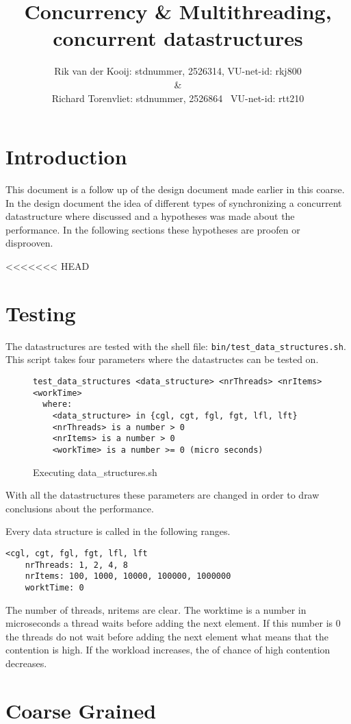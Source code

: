 \documentclass[10pt,a4paper]{article}
\author{Rik van der Kooij: stdnummer, 2526314, VU-net-id: rkj800\\ \&  \\ Richard Torenvliet: stdnummer, 2526864 \ VU-net-id: rtt210}
\title{Concurrency \& Multithreading, concurrent datastructures}
\begin{document}
\maketitle
\tableofcontents

\section{Introduction}
This document is a follow up of the design document made earlier in this coarse. In the design document the idea of different types of synchronizing a concurrent datastructure where discussed and a hypotheses was made about the performance. In the following sections these hypotheses are proofen or disprooven.

<<<<<<< HEAD
\section{Testing}
The datastructures are tested with the shell file: \texttt{bin/test\_data\_structures.sh}. This script takes four parameters where the datastructes can be tested on.

\begin{figure}
\center
\begin{lstlisting}
test_data_structures <data_structure> <nrThreads> <nrItems> <workTime>
  where:
    <data_structure> in {cgl, cgt, fgl, fgt, lfl, lft}
    <nrThreads> is a number > 0
    <nrItems> is a number > 0
    <workTime> is a number >= 0 (micro seconds)
\end{lstlisting}
\caption{Executing data\_structures.sh}
\end{figure}

With all the datastructures these parameters are changed in order to draw conclusions about the performance. 

Every data structure is called in the following ranges.
\begin{lstlisting}
<cgl, cgt, fgl, fgt, lfl, lft
	nrThreads: 1, 2, 4, 8
	nrItems: 100, 1000, 10000, 100000, 1000000
	worktTime: 0
\end{lstlisting}

The number of threads, nritems are clear. The worktime is a number in microseconds a thread waits before adding the next element. If this number is 0 the threads do not wait before adding the next element what means that the contention is high. If the workload increases, the of chance of high contention decreases.

\section{Coarse Grained}
\end{document}
